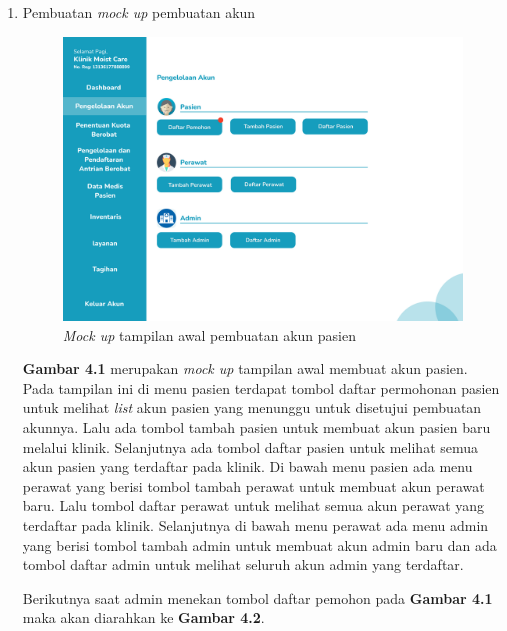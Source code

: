 \begin{enumerate}
	
	\item Pembuatan \emph{mock up} pembuatan akun

	\begin{figure}[H]
		\centering
		\includegraphics[width=12cm]{gambar/mockup_web/Pembuatan Akun 1.png}
		\caption{\emph{Mock up} tampilan awal pembuatan akun pasien}
		\label{Gambar:tampilanawalpembuatanakunpasien}
	\end{figure}
	
	\textbf{Gambar 4.1} merupakan \emph{mock up} tampilan awal membuat akun pasien. Pada tampilan ini di menu pasien terdapat tombol daftar permohonan pasien untuk melihat \emph{list} akun pasien yang menunggu untuk disetujui pembuatan akunnya. Lalu ada tombol tambah pasien untuk membuat akun pasien baru melalui klinik. Selanjutnya ada tombol daftar pasien untuk melihat semua akun pasien yang terdaftar pada klinik. Di bawah menu pasien ada menu perawat yang berisi tombol tambah perawat untuk membuat akun perawat baru. Lalu tombol daftar perawat untuk melihat semua akun perawat yang terdaftar pada klinik. Selanjutnya di bawah menu perawat ada menu admin yang berisi tombol tambah admin untuk membuat akun admin baru dan ada tombol daftar admin untuk melihat seluruh akun admin yang terdaftar.
	
	Berikutnya saat admin menekan tombol daftar pemohon pada \textbf{Gambar 4.1} maka akan diarahkan ke \textbf{Gambar 4.2}.
	 

\end{enumerate}
